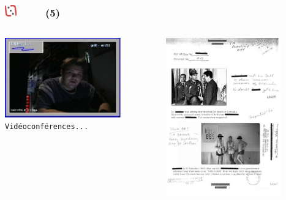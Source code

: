 \documentclass[slidetop,11pt]{beamer}
\def\moreInFrameTitleLeftt{\includegraphics[height=0.5cm]{img/ligueludique-0.png}~~~~~}
\begin{document}
\begin{frame}
	\frametitle{\moreInFrameTitleLeftt \sectionPartIIaV  (5) }
	\begin{columns}[T]
		\begin{column}[T]{5.05cm}
			\includegraphics[width=5.00cm]{img/majesticARGgame/tu-fais-ch-joe-tu-sais-quelle-heure-il-est-ici-ME0000034570_2.jpg}~\\
			\texttt{\footnotesize Vid{\'e}oconf{\'e}rences... }
		\end{column}
		\begin{column}[T]{5.05cm}
			\includegraphics[width=5.00cm]{img/majesticARGgame/youve-got-fax-ME0000034568_2.jpg}~\\
		\end{column}
	\end{columns}
\end{frame}

\def\sectionPartIIaVI{ This is Not a Game (WJW) }
\end{document}

